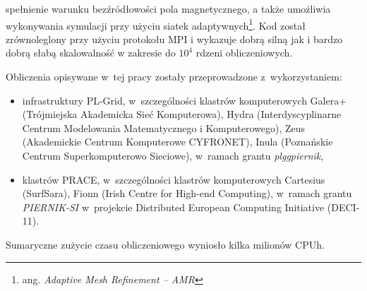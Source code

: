 spełnienie warunku bezźródłowości pola magnetycznego, a także umożliwia
wykonywania symulacji przy użyciu siatek adaptywnych\footnote{ang.
\emph{Adaptive Mesh Refinement -- AMR}}. Kod został zrównoleglony przy użyciu
protokołu MPI i wykazuje dobrą silną jak i bardzo dobrą słabą skalowalność w
zakresie do $10^4$ rdzeni obliczeniowych.
%
\par Obliczenia opisywane w~tej pracy zostały przeprowadzone z~wykorzystaniem:
%
\begin{itemize}
   \item infrastruktury PL-Grid, w~szczególności klastrów
      komputerowych Galera+ (Trójmiejska Akademicka Sieć Komputerowa), Hydra
      (Interdyscyplinarne Centrum Modelowania Matematycznego i Komputerowego),
      Zeus (Akademickie Centrum Komputerowe CYFRONET), Inula (Poznańskie Centrum
      Superkomputerowo Sieciowe), w~ramach grantu \emph{plggpiernik},
   \item klastrów PRACE, w~szczególności klastrów komputerowych
      Cartesius (SurfSara), Fionn (Irish Centre for High-end Computing),
      w~ramach grantu \emph{PIERNIK-SI} w~projekcie Distributed European
      Computing Initiative (DECI-11).
\end{itemize}
Sumaryczne zużycie czasu obliczeniowego wyniosło kilka milionów CPUh.
%
